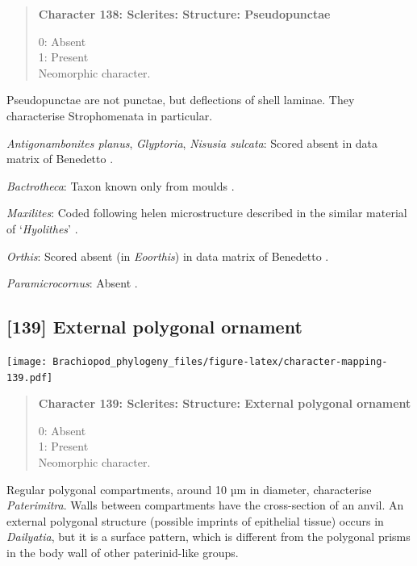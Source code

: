 \documentclass[openany]{book}
\begin{document}
\begin{quote}
\textbf{Character 138: Sclerites: Structure: Pseudopunctae}

0: Absent\\
1: Present\\
Neomorphic character.
\end{quote}

Pseudopunctae are not punctae, but deflections of shell laminae. They
characterise Strophomenata in particular.

\hypertarget{Antigonambonites_planus-coding-138}{}
\emph{Antigonambonites planus}, \emph{Glyptoria}, \emph{Nisusia
sulcata}: Scored absent in data matrix of Benedetto
\citeyearpar{Benedetto2009iChaniella}.

\hypertarget{Bactrotheca-coding-138}{}
\emph{Bactrotheca}: Taxon known only from moulds \citep{Valent2012}.

\hypertarget{Maxilites-coding-138}{}
\emph{Maxilites}: Coded following helen microstructure described in the
similar material of `\emph{Hyolithes}' \citep{MartiMus2007}.

\hypertarget{Orthis-coding-138}{}
\emph{Orthis}: Scored absent (in \emph{Eoorthis}) in data matrix of
Benedetto \citeyearpar{Benedetto2009iChaniella}.

\hypertarget{Paramicrocornus-coding-138}{}
\emph{Paramicrocornus}: Absent \citep{Zhang2018Ahyolithid}.

\subsection*{{[}139{]} External polygonal
ornament}\label{external-polygonal-ornament}

\texttt{[image: Brachiopod\_phylogeny\_files/figure-latex/character-mapping-139.pdf]}

\begin{quote}
\textbf{Character 139: Sclerites: Structure: External polygonal
ornament}

0: Absent\\
1: Present\\
Neomorphic character.
\end{quote}

Regular polygonal compartments, around 10 µm in diameter, characterise
\emph{Paterimitra}. Walls between compartments have the cross-section of
an anvil. An external polygonal structure (possible imprints of
epithelial tissue) occurs in \emph{Dailyatia}, but it is a surface
pattern, which is different from the polygonal prisms in the body wall
of other paterinid-like groups.
\end{document}
